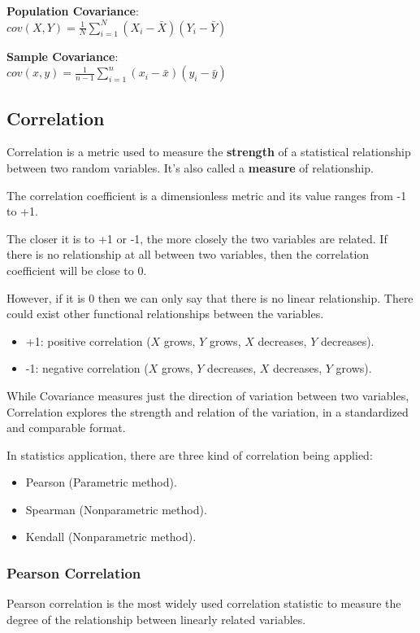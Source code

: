 \documentclass{article}
\begin{document}
\textbf{Population Covariance}: \\ 
$\displaystyle cov(X, Y) = \frac{1}{N}\sum \limits_{i=1}^N (X_i - \bar{X})(Y_i - \bar{Y})$

\textbf{Sample Covariance}: \\ 
$\displaystyle cov(x, y) = \frac{1}{n-1}\sum \limits_{i=1}^n (x_i - \bar{x})(y_i - \bar{y})$

\subsection{Correlation}
Correlation is a metric used to measure the \textbf{strength} of a  statistical relationship between two random variables. It’s also called a \textbf{measure} of relationship.

The correlation coefficient is a dimensionless metric and its value ranges from -1 to +1. 

The closer it is to +1 or -1, the more closely the two variables are related. 
If there is no relationship at all between two variables, then the correlation coefficient will be close to 0. 

However, if it is 0 then we can only say that there is no linear relationship. There could exist other functional relationships between the variables.

\begin{itemize}
    \item +1: positive correlation ($X$ grows, $Y$ grows, $X$ decreases, $Y$ decreases).
    \item -1: negative correlation ($X$ grows, $Y$ decreases, $X$ decreases, $Y$ grows).
\end{itemize}

While Covariance measures just the direction of variation between two variables, Correlation explores the strength and relation of the variation, in a standardized and comparable format.

In statistics application, there are three kind of correlation being applied:

\begin{itemize}
    \item Pearson (Parametric method).
    \item Spearman (Nonparametric method).
    \item Kendall (Nonparametric method).
\end{itemize}

\subsubsection{Pearson Correlation}
Pearson correlation is the most widely used correlation statistic to measure the degree of the relationship between linearly related variables. 
\end{document}
